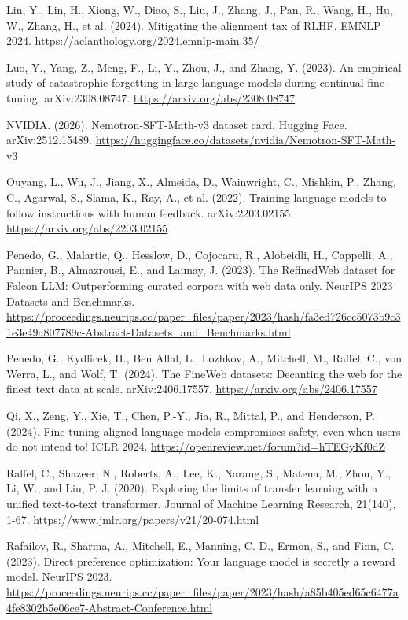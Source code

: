\documentclass[11pt]{article}
\begin{document}
Lin, Y., Lin, H., Xiong, W., Diao, S., Liu, J., Zhang, J., Pan, R., Wang, H., Hu, W., Zhang, H., et al. (2024). Mitigating the alignment tax of RLHF. EMNLP 2024. \url{https://aclanthology.org/2024.emnlp-main.35/}

Luo, Y., Yang, Z., Meng, F., Li, Y., Zhou, J., and Zhang, Y. (2023). An empirical study of catastrophic forgetting in large language models during continual fine-tuning. arXiv:2308.08747. \url{https://arxiv.org/abs/2308.08747}

NVIDIA. (2026). Nemotron-SFT-Math-v3 dataset card. Hugging Face. arXiv:2512.15489. \url{https://huggingface.co/datasets/nvidia/Nemotron-SFT-Math-v3}

Ouyang, L., Wu, J., Jiang, X., Almeida, D., Wainwright, C., Mishkin, P., Zhang, C., Agarwal, S., Slama, K., Ray, A., et al. (2022). Training language models to follow instructions with human feedback. arXiv:2203.02155. \url{https://arxiv.org/abs/2203.02155}

Penedo, G., Malartic, Q., Hesslow, D., Cojocaru, R., Alobeidli, H., Cappelli, A., Pannier, B., Almazrouei, E., and Launay, J. (2023). The RefinedWeb dataset for Falcon LLM: Outperforming curated corpora with web data only. NeurIPS 2023 Datasets and Benchmarks. \url{https://proceedings.neurips.cc/paper_files/paper/2023/hash/fa3ed726cc5073b9c31e3e49a807789c-Abstract-Datasets_and_Benchmarks.html}

Penedo, G., Kydlicek, H., Ben Allal, L., Lozhkov, A., Mitchell, M., Raffel, C., von Werra, L., and Wolf, T. (2024). The FineWeb datasets: Decanting the web for the finest text data at scale. arXiv:2406.17557. \url{https://arxiv.org/abs/2406.17557}

Qi, X., Zeng, Y., Xie, T., Chen, P.-Y., Jia, R., Mittal, P., and Henderson, P. (2024). Fine-tuning aligned language models compromises safety, even when users do not intend to! ICLR 2024. \url{https://openreview.net/forum?id=hTEGyKf0dZ}

Raffel, C., Shazeer, N., Roberts, A., Lee, K., Narang, S., Matena, M., Zhou, Y., Li, W., and Liu, P. J. (2020). Exploring the limits of transfer learning with a unified text-to-text transformer. Journal of Machine Learning Research, 21(140), 1-67. \url{https://www.jmlr.org/papers/v21/20-074.html}

Rafailov, R., Sharma, A., Mitchell, E., Manning, C. D., Ermon, S., and Finn, C. (2023). Direct preference optimization: Your language model is secretly a reward model. NeurIPS 2023. \url{https://proceedings.neurips.cc/paper_files/paper/2023/hash/a85b405ed65c6477a4fe8302b5e06ce7-Abstract-Conference.html}
\end{document}
